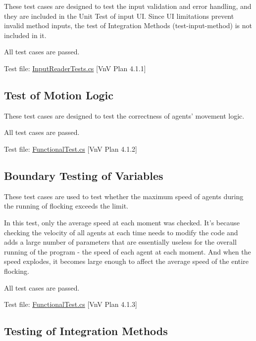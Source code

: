 \documentclass[12pt, titlepage]{article}
\begin{document}
These test cases are designed to test the input validation and error handling, 
and they are included in the Unit Test of input UI. Since UI limitations 
prevent invalid method inputs, the test of Integration Methods 
(test-input-method) is not included in it. 

All test cases are passed. 

Test file: \href{https://github.com/Mei0725/FlockingSimulator/blob/main/src/Assets/Tests/IO/InputReaderTests.cs}{InputReaderTests.cs} [VnV Plan 4.1.1]

\subsection{Test of Motion Logic} \label{motionTest}

These test cases are designed to test the correctness of agents' movement logic. 

All test cases are passed. 

Test file: \href{https://github.com/Mei0725/FlockingSimulator/blob/main/src/Assets/Tests/FunctionalTest/FunctionalTest.cs}{FunctionalTest.cs} [VnV Plan 4.1.2]

\subsection{Boundary Testing of Variables} \label{boundaryTest}

These test cases are used to test whether the maximum speed of agents during 
the running of flocking exceeds the limit. 

In this test, only the average speed at each moment was checked. It's because 
checking the velocity of all agents at each time needs to modify the code 
and adds a large number of parameters that are essentially useless for the 
overall running of the program - the speed of each agent at each moment. And 
when the speed explodes, it becomes large enough to affect the average speed 
of the entire flocking.

All test cases are passed. 

Test file: \href{https://github.com/Mei0725/FlockingSimulator/blob/main/src/Assets/Tests/FunctionalTest/FunctionalTest.cs}{FunctionalTest.cs} [VnV Plan 4.1.3]

\subsection{Testing of Integration Methods} \label{methodTest}
\end{document}

